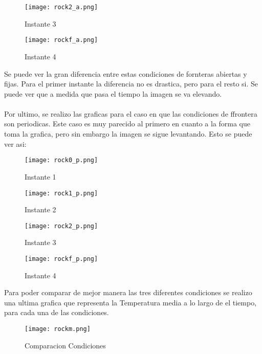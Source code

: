 \documentclass{article}[11]
\begin{document}
\begin{figure}
    \centering
    \texttt{[image: rock2\_a.png]}
    \caption{Instante 3}
    \label{fig:my_label}
\end{figure}

\begin{figure}
    \centering
    \texttt{[image: rockf\_a.png]}
    \caption{Instante 4}
    \label{fig:my_label}
\end{figure}

Se puede ver la gran diferencia entre estas condiciones de fornteras abiertas y fijas. Para el primer instante la diferencia no es drastica, pero para el resto si. Se puede ver que a medida que pasa el tiempo la imagen se va elevando.
\\
\\
Por ultimo, se realizo las graficas para el caso en que las condiciones de ffrontera son periodicas. Este caso es muy parecido al primero en cuanto a la forma que toma la grafica, pero sin embargo la imagen se sigue levantando. Esto se puede ver asi:
\begin{figure}
    \centering
    \texttt{[image: rock0\_p.png]}
    \caption{Instante 1}
    \label{fig:my_label}
\end{figure}

\begin{figure}
    \centering
    \texttt{[image: rock1\_p.png]}
    \caption{Instante 2}
    \label{fig:my_label}
\end{figure}

\begin{figure}
    \centering
    \texttt{[image: rock2\_p.png]}
    \caption{Instante 3}
    \label{fig:my_label}
\end{figure}

\begin{figure}
    \centering
    \texttt{[image: rockf\_p.png]}
    \caption{Instante 4}
    \label{fig:my_label}
\end{figure}

    
Para poder comparar de mejor manera las tres diferentes condiciones se realizo una ultima grafica que representa la Temperatura media a lo largo de el tiempo, para cada una de las condiciones.
\begin{figure}
    \centering
    \texttt{[image: rockm.png]}
    \caption{Comparacion Condiciones}
    \label{fig:my_label}
\end{figure}    
\end{document}
